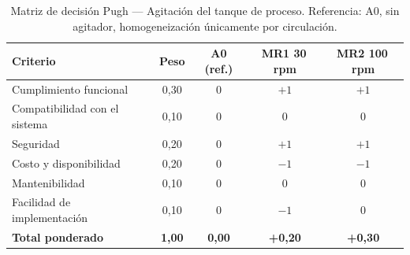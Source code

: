 \begin{table}[H]
\centering
\caption{Matriz de decisión Pugh --- Agitación del tanque de proceso. Referencia: A0, sin agitador, homogeneización únicamente por circulación.}
\label{tab:pugh-agitacion}
\begin{tabularx}{\textwidth}{Xcccc}
\toprule
\textbf{Criterio} & \textbf{Peso} & \textbf{A0 (ref.)} & \textbf{MR1 30\,rpm} & \textbf{MR2 100\,rpm} \\
\midrule
Cumplimiento funcional        & 0,30 & 0 & $+1$ & $+1$ \\
Compatibilidad con el sistema & 0,10 & 0 & 0    & 0 \\
Seguridad                     & 0,20 & 0 & $+1$ & $+1$ \\
Costo y disponibilidad        & 0,20 & 0 & $-1$ & $-1$ \\
Mantenibilidad                & 0,10 & 0 & 0    & 0 \\
Facilidad de implementación   & 0,10 & 0 & $-1$ & 0 \\
\midrule
\textbf{Total ponderado}      & \textbf{1,00} & \textbf{0,00} & \textbf{+0,20} & \textbf{+0,30} \\
\bottomrule
\end{tabularx}
\end{table}
